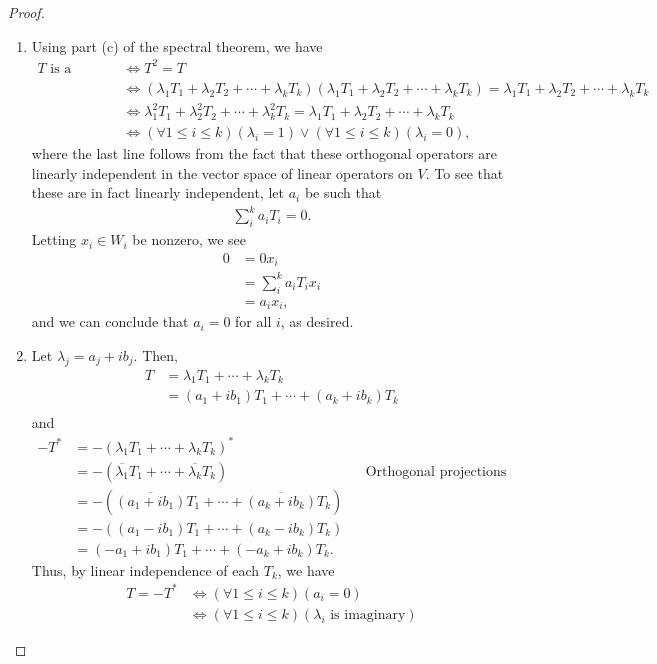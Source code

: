\documentclass[10pt,a4paper]{article}
\theoremstyle{definition}
\begin{document}
\begin{proof}
\begin{enumerate}
\item Using part (c) of the spectral theorem, we have
\begin{align*}
T \text{ is a projection} &\iff T^2 = T \\
&\iff (\lambda_1 T_1 + \lambda_2 T_2 + \cdots + \lambda_k T_k)(\lambda_1 T_1 + \lambda_2 T_2 + \cdots + \lambda_k T_k) = \lambda_1 T_1 + \lambda_2 T_2 + \cdots + \lambda_k T_k\\
&\iff \lambda^2_1 T_1 + \lambda^2_2 T_2 + \cdots + \lambda^2_k T_k = \lambda_1 T_1 + \lambda_2 T_2 + \cdots + \lambda_k T_k\\
&\iff (\forall 1 \leq i \leq k)(\lambda_i = 1) \lor (\forall 1 \leq i \leq k)(\lambda_i = 0),
\end{align*}
where the last line follows from the fact that these orthogonal operators are linearly independent in the vector space of linear operators on $V$. To see that these are in fact linearly independent, let $a_i$ be such that 
\begin{align*}
\sum_i^k a_iT_i = 0.
\end{align*}
Letting $x_i \in W_i$ be nonzero, we see
\begin{align*}
0 &= 0x_i\\
&= \sum_i^k a_iT_i x_i\\
&= a_i x_i,
\end{align*}
and we can conclude that $a_i = 0$ for all $i$, as desired.

\item Let $\lambda_j = a_j + ib_j$. Then,
\begin{align*}
T &= \lambda_1 T_1  + \cdots + \lambda_k T_k\\
&= (a_1 + ib_1) T_1  + \cdots + (a_k + ib_k) T_k\\
\end{align*}
and
\begin{align*}
-T^* &= -(\lambda_1 T_1  + \cdots + \lambda_k T_k)^*\\
&= -(\overline{\lambda_1} T_1  + \cdots + \overline{\lambda_k} T_k) && \text{Orthogonal projections are hermitian}\\
&= -(\overline{(a_1 + ib_1)} T_1  + \cdots + \overline{(a_k + ib_k)} T_k)\\
&= -((a_1 - ib_1) T_1  + \cdots + (a_k - ib_k) T_k)\\
&= (-a_1 + ib_1) T_1  + \cdots + (-a_k + ib_k) T_k.
\end{align*}
Thus, by linear independence of each $T_k$, we have 
\begin{align*}
T = -T^* &\iff (\forall 1 \leq i \leq k)(a_i = 0)\\
&\iff (\forall 1 \leq i \leq k)(\lambda_i \text{ is imaginary})
\end{align*}
\end{enumerate}
\end{proof}
\end{document}
